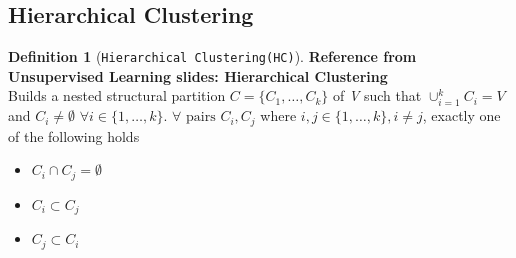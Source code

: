 \documentclass[a4paper,10pt]{article}
\theoremstyle{plain}
\theoremstyle{definition}
\newtheorem{defn}{Definition}
\begin{document}
\subsection{Hierarchical Clustering}

\begin{defn}[\texttt{Hierarchical Clustering(HC)}]\label{def:hc}
	\textbf{Reference from Unsupervised Learning slides: Hierarchical Clustering}\\
	Builds a nested structural partition $C = 	\{ C_1, \dots, C_k\}$ of \textit{V} such that $\cup_{i = 1}^{k} C_i = V$ and $C_i \neq \emptyset$ $\forall i \in \{1, \dots, k\}$. $\forall \text{ pairs } C_i, C_j$ where $i,j \in \{1, \dots, k\}, i \neq j$, exactly one of the following holds
	\begin{itemize}
		\item $C_i \cap C_j = \emptyset$
		\item $C_i \subset C_j$
		\item $C_j \subset C_i$
	\end{itemize}
\end{defn}
\end{document}
